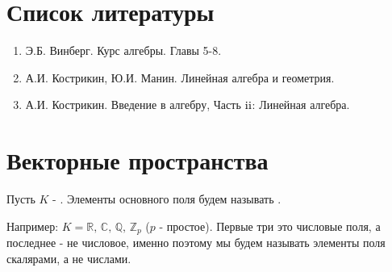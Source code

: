 \documentclass[12pt]{article}
\newcommand{\RN}[1]{%
	\textup{\uppercase\expandafter{\romannumeral#1}}%
}
\newcommand{\MR}{\mathbb{R}}
\newcommand{\MC}{\mathbb{C}}
\newcommand{\MQ}{\mathbb{Q}}
\newcommand{\MZ}{\mathbb{Z}}
\theoremstyle{definition}
\begin{document}

\section*{Список литературы}
\begin{enumerate}[label=\arabic*)]
	\item Э.Б. Винберг. Курс алгебры. Главы 5-8.
	\item А.И. Кострикин, Ю.И. Манин. Линейная алгебра и геометрия.
	\item А.И. Кострикин. Введение в алгебру, Часть $\RN{2}$: Линейная алгебра.
\end{enumerate}

\section*{Векторные пространства}

Пусть $K$ - . Элементы основного поля будем называть .

Например: $K = \MR, \, \MC,\, \MQ, \, \MZ_p$ ($p$ - простое). Первые три это числовые поля, а последнее - не числовое, именно поэтому мы будем называть элементы поля скалярами, а не числами.
\end{document}
